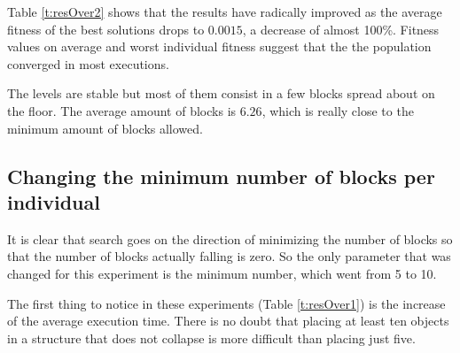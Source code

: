 \documentclass[sigconf]{acmart}
\begin{document}
Table \ref{t:resOver2} shows that the results have radically improved as the 
average fitness of the best solutions drops to $0.0015$, a decrease of almost 
100\%. Fitness values on average and worst individual fitness suggest that the
the population converged in most executions. 

The levels are stable but 
most of them consist in a 
few blocks spread about on the floor.
The average amount of blocks is $6.26$, 
which is really close to the minimum amount of blocks allowed.


\subsection{Changing the minimum number of blocks per individual}\label{E4}
It is clear that search goes on the direction
of minimizing the number of blocks so that the number of blocks
actually falling is zero.
So the only parameter that was changed for this experiment is the minimum
number, which went from 5 to 10. 

The first thing to notice in these experiments (Table \ref{t:resOver1}) is the 
increase of the average execution time.
There is no doubt 
that placing at least ten objects in a structure that does not
collapse is more difficult than placing just five.
\end{document}
